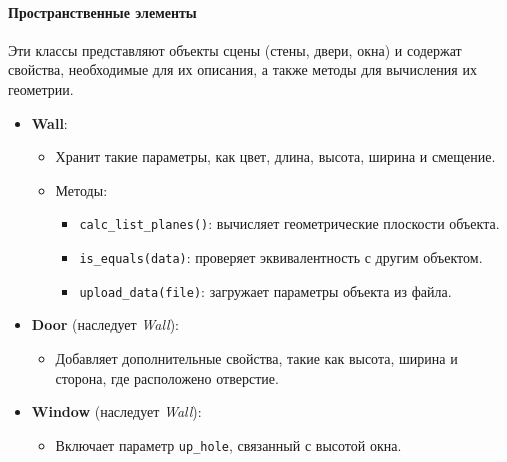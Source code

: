 \paragraph{Пространственные элементы}
\hspace{1.25cm}
Эти классы представляют объекты сцены (стены, двери, окна) и содержат свойства, необходимые для их описания, а также методы для вычисления их геометрии.
\begin{itemize}
    \item \textbf{Wall}:
    \begin{itemize}
        \item Хранит такие параметры, как цвет, длина, высота, ширина и смещение.
        \item Методы:
        \begin{itemize}
            \item \verb|calc_list_planes()|: вычисляет геометрические плоскости объекта.
            \item \verb|is_equals(data)|: проверяет эквивалентность с другим объектом.
            \item \verb|upload_data(file)|: загружает параметры объекта из файла.
        \end{itemize}
    \end{itemize}
    \item \textbf{Door} (наследует \textit{Wall}):
    \begin{itemize}
        \item Добавляет дополнительные свойства, такие как высота, ширина и сторона, где расположено отверстие.
    \end{itemize}
    \item \textbf{Window} (наследует \textit{Wall}):
    \begin{itemize}
        \item Включает параметр \verb|up_hole|, связанный с высотой окна.
    \end{itemize}
\end{itemize}

